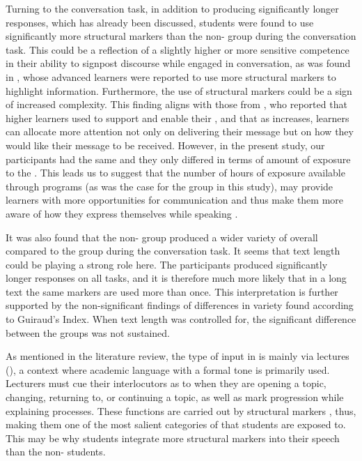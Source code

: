\documentclass[output=paper]{langsci/langscibook}
\begin{document}
Turning to the conversation task, in addition to producing significantly longer responses, which has already been discussed,  students were found to use significantly more structural markers than the non- group during the conversation task. This could be a reflection of a slightly higher or more sensitive  competence in their ability to signpost discourse while engaged in conversation, as was found in \citet{Wei2011}, whose advanced learners were reported to use more structural markers to highlight information. Furthermore, the use of structural markers could be a sign of increased  complexity. This finding aligns with those from \citet{Neary-Sundquist2014}, who reported that higher  learners used  to support and enable their , and that as  increases, learners can allocate more attention not only on delivering their message but on how they would like their message to be received. However, in the present study, our participants had the same  and they only differed in terms of amount of exposure to the . This leads us to suggest that the number of hours of exposure available through  programs (as was the case for the  group in this study), may provide learners with more opportunities for communication and thus make them more aware of how they express themselves while speaking .

\largerpage
It was also found that the non- group produced a wider variety of  overall compared to the  group during the conversation task. It seems that text length could be playing a strong role here. The  participants produced significantly longer responses on all tasks, and it is therefore much more likely that in a long text the same markers are used more than once. This interpretation is further supported by the non-significant findings of differences in variety found according to Guiraud’s Index. When text length was controlled for, the significant difference between the groups was not sustained.

As mentioned in the literature review, the type of input in  is mainly via lectures (\citealt{HellekjaerHellekjaer2015}), a context where academic language with a formal tone is primarily used. Lecturers must cue their interlocutors as to when they are opening a topic, changing, returning to, or continuing a topic, as well as mark progression while explaining processes. These functions are carried out by structural markers \citep{Andersen2001}, thus, making them one of the most salient categories of  that  students are exposed to. This may be why  students integrate more structural markers into their speech than the non- students. 
\end{document}
